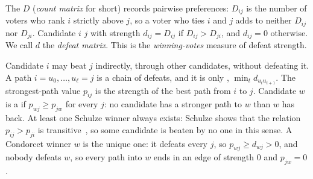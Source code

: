 The  $D$ (\emph{count matrix} for short) records
pairwise preferences: $D_{ij}$ is the number of voters who rank $i$
strictly above $j$, so a voter who ties $i$ and $j$ adds to neither
$D_{ij}$ nor $D_{ji}$. Candidate $i$  $j$ with strength
$d_{ij} = D_{ij}$ if $D_{ij} > D_{ji}$, and $d_{ij} = 0$ otherwise. We
call $d$ the \emph{defeat matrix}. This is the \emph{winning-votes}
measure of defeat strength. 

Candidate $i$ may beat $j$ indirectly, through other candidates, without
defeating it. A path $i = u_0, \ldots, u_\ell = j$ is a chain of defeats,
and it is only ,
$\min_t d_{u_t u_{t+1}}$. The strongest-path value $p_{ij}$ is the
strength of the best path from $i$ to $j$. Candidate $w$ is a
 if $p_{wj} \ge p_{jw}$ for every $j$: no candidate
has a stronger path to $w$ than $w$ has back. At least one Schulze
winner always exists: Schulze shows that the relation $p_{ij} > p_{ji}$
is transitive~\cite{schulze2011}, so some candidate is beaten by no one
in this sense. A Condorcet winner $w$ is the unique one: it
defeats every $j$, so $p_{wj} \ge d_{wj} > 0$, and nobody defeats $w$, so
every path into $w$ ends in an edge of strength $0$ and $p_{jw} = 0$.

